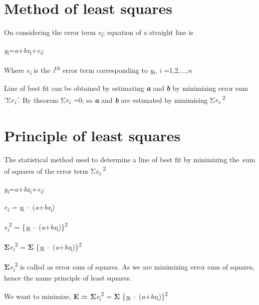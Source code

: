 \documentclass[
]{book}
\begin{document}
\hypertarget{method-of-least-squares}{%
\section{Method of least squares}\label{method-of-least-squares}}

On considering the error term \emph{e}\textsubscript{i}; equation of a straight line is

\emph{y}\textsubscript{i}=\emph{a}+\emph{bx}\textsubscript{i}+\emph{e\textsubscript{i}};

Where \emph{e\textsubscript{i}} is the \emph{i}\textsuperscript{th} error term corresponding to \emph{y}\textsubscript{i}, \emph{i}
=1,2,...,\emph{n}

Line of best fit can be obtained by estimating \textbf{\emph{a}} and \textbf{\emph{b}} by
minimizing error sum 'Σ\emph{e\textsubscript{i}'}. By theorem Σ\emph{e\textsubscript{i} =}0; so \textbf{\emph{a}} and
\textbf{\emph{b}} are estimated by minimising Σ\emph{e\textsubscript{i}} \textsuperscript{2}

\hypertarget{principle-of-least-squares}{%
\section{Principle of least squares}\label{principle-of-least-squares}}

The statistical method used to determine a line of best fit by
minimizing the~sum of squares of the error term Σ\emph{e\textsubscript{i}} \textsuperscript{2}

\emph{y\textsubscript{i}}=\emph{a}+\emph{bx}\textsubscript{i}+\emph{e\textsubscript{i}};

\emph{e\textsubscript{i} =} \emph{y}\textsubscript{i} -- (\emph{a}+\emph{bx}\textsubscript{i})

\emph{e\textsubscript{i}}\textsuperscript{2} = \{\emph{y}\textsubscript{i} -- (\emph{a}+\emph{bx}\textsubscript{i})\}\textsuperscript{2}

\textbf{Σ}\emph{e\textsubscript{i}}\textsuperscript{2} = \textbf{Σ} \{\emph{y}\textsubscript{i} -- (\emph{a}+\emph{bx}\textsubscript{i})\}\textsuperscript{2}

\textbf{Σ}\emph{e\textsubscript{i}}\textsuperscript{2} is called as error sum of squares. As we are minimizing
error sum of squares, hence the name principle of least squares.

We want to minimize, \textbf{E = Σ}\emph{e}\textsubscript{i}\textsuperscript{2} = \textbf{Σ} \{\emph{y}\textsubscript{i} --
(\emph{a}+\emph{bx}\textsubscript{i})\}\textsuperscript{2}
\end{document}
